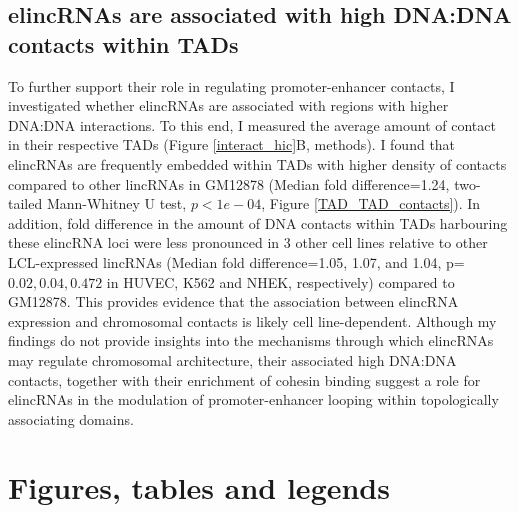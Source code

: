 \documentclass[11pt,a4paper]{report}
\begin{document}
\subsection*{elincRNAs are associated with high DNA:DNA contacts within TADs}

To further support their role in regulating promoter-enhancer contacts, I investigated whether elincRNAs are associated with regions with higher DNA:DNA interactions. To this end, I measured the average amount of contact in their respective TADs (Figure \ref{interact_hic}B, methods). I found that elincRNAs are frequently embedded within TADs with higher density of contacts compared to other lincRNAs in GM12878 (Median fold difference=1.24, two-tailed Mann-Whitney U test, $p<1e-04$, Figure \ref{TAD_TAD_contacts}). In addition, fold difference in the amount of DNA contacts within TADs harbouring these elincRNA loci were less pronounced in 3 other cell lines relative to other LCL-expressed lincRNAs (Median fold difference=1.05, 1.07, and 1.04, p=$0.02, 0.04, 0.472$ in HUVEC, K562 and NHEK, respectively) compared to GM12878. This provides evidence that the association between elincRNA expression and chromosomal contacts is likely cell line-dependent. 
Although my findings do not provide insights into the mechanisms through which elincRNAs may regulate chromosomal architecture, their associated high DNA:DNA contacts, together with their enrichment of cohesin binding suggest a role for elincRNAs in the modulation of promoter-enhancer looping within topologically associating domains.

\section*{Figures, tables and legends}
\end{document}
